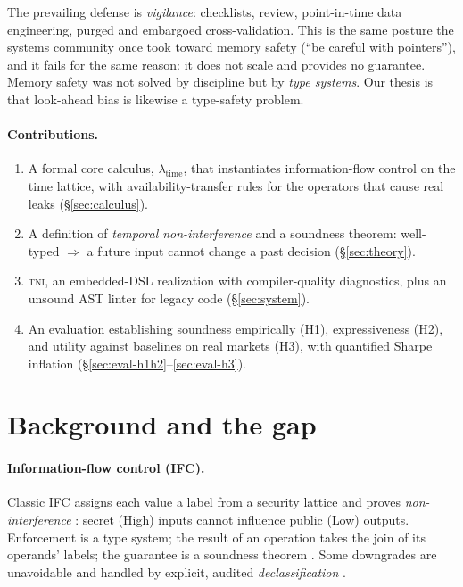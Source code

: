 \documentclass[11pt]{article}
\newcommand{\tni}{\textsc{tni}}
\newcommand{\lt}{$\lambda_{\text{time}}$}
\theoremstyle{plain}
\theoremstyle{definition}
\begin{document}
The prevailing defense is \emph{vigilance}: checklists, review, point-in-time
data engineering, purged and embargoed cross-validation. This is the same posture
the systems community once took toward memory safety (``be careful with
pointers''), and it fails for the same reason: it does not scale and provides no
guarantee. Memory safety was not solved by discipline but by \emph{type
systems}. Our thesis is that look-ahead bias is likewise a type-safety problem.

\paragraph{Contributions.}
\begin{enumerate}\itemsep2pt
  \item A formal core calculus, \lt, that instantiates information-flow control
    on the time lattice, with availability-transfer rules for the operators that
    cause real leaks (\S\ref{sec:calculus}).
  \item A definition of \emph{temporal non-interference} and a soundness
    theorem: well-typed $\Rightarrow$ a future input cannot change a past
    decision (\S\ref{sec:theory}).
  \item \tni, an embedded-DSL realization with compiler-quality diagnostics,
    plus an unsound AST linter for legacy code (\S\ref{sec:system}).
  \item An evaluation establishing soundness empirically (H1), expressiveness
    (H2), and utility against baselines on real markets (H3), with quantified
    Sharpe inflation (\S\ref{sec:eval-h1h2}--\ref{sec:eval-h3}).
\end{enumerate}

\section{Background and the gap}\label{sec:background}

\paragraph{Information-flow control (IFC).}
Classic IFC assigns each value a label from a security lattice
\citep{denning1976lattice} and proves \emph{non-interference}
\citep{goguen1982security}: secret (\textsf{High}) inputs cannot influence
public (\textsf{Low}) outputs. Enforcement is a type system; the result of an
operation takes the join of its operands' labels; the guarantee is a soundness
theorem \citep{volpano1996sound}. Some downgrades are unavoidable and handled by
explicit, audited \emph{declassification} \citep{sabelfeld2003language}.
\end{document}
